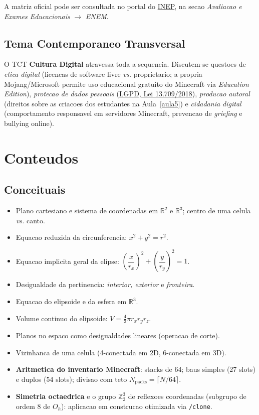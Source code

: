 \documentclass[12pt,a4paper]{scrartcl}
\newcommand{\acc}[1]{\textcolor{accent}{\textbf{#1}}}
\newcommand{\cmd}[1]{\textcolor{earth}{\texttt{\small #1}}}
\begin{document}
A matriz oficial pode ser consultada no portal do \href{https://www.gov.br/inep/}{INEP}, na secao \emph{Avaliacao e Exames Educacionais} $\rightarrow$ \emph{ENEM}.

\subsection{Tema Contemporaneo Transversal}

O TCT \acc{Cultura Digital} atravessa toda a sequencia. Discutem-se questoes de \emph{etica digital} (licencas de software livre \emph{vs.} proprietario; a propria Mojang/Microsoft permite uso educacional gratuito do Minecraft via \emph{Education Edition}), \emph{protecao de dados pessoais} (\href{https://www.planalto.gov.br/ccivil_03/_ato2015-2018/2018/lei/l13709.htm}{LGPD, Lei 13.709/2018}), \emph{producao autoral} (direitos sobre as criacoes dos estudantes na Aula~\ref{aula5}) e \emph{cidadania digital} (comportamento responsavel em servidores Minecraft, prevencao de \emph{griefing} e bullying online).

\section{Conteudos}\label{sec:conteudos}

\subsection{Conceituais}
\begin{itemize}[leftmargin=1.3em,itemsep=0.15em,topsep=0.3em]
  \item Plano cartesiano e sistema de coordenadas em $\mathbb{R}^2$ e $\mathbb{R}^3$; centro de uma celula \emph{vs.} canto.
  \item Equacao reduzida da circunferencia: $x^2 + y^2 = r^2$.
  \item Equacao implicita geral da elipse: $\left(\dfrac{x}{r_x}\right)^{\!2} + \left(\dfrac{y}{r_y}\right)^{\!2} = 1$.
  \item Desigualdade da pertinencia: \emph{interior, exterior} e \emph{fronteira}.
  \item Equacao do elipsoide e da esfera em $\mathbb{R}^3$.
  \item Volume continuo do elipsoide: $V = \tfrac{4}{3}\pi r_x r_y r_z$.
  \item Planos no espaco como desigualdades lineares (operacao de corte).
  \item Vizinhanca de uma celula (4-conectada em 2D, 6-conectada em 3D).
  \item \acc{Aritmetica do inventario Minecraft}: stacks de 64; baus simples (27 slots) e duplos (54 slots); divisao com teto $N_{\mathrm{packs}} = \lceil N/64 \rceil$.
  \item \acc{Simetria octaedrica} e o grupo $\mathbb{Z}_2^3$ de reflexoes coordenadas (subgrupo de ordem 8 de $O_h$): aplicacao em construcao otimizada via \cmd{/clone}.
\end{itemize}
\end{document}
